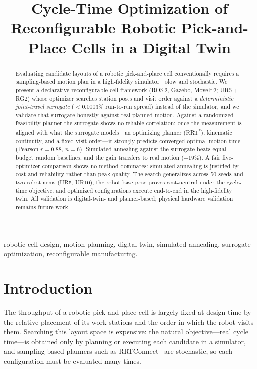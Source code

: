 \documentclass[conference]{IEEEtran}
\begin{document}
\title{Cycle-Time Optimization of Reconfigurable Robotic Pick-and-Place Cells in a Digital Twin}

\author{
}

\maketitle

\begin{abstract}
Evaluating candidate layouts of a robotic pick-and-place cell conventionally requires a
sampling-based motion plan in a high-fidelity simulator---slow and stochastic. We present a
declarative reconfigurable-cell framework (ROS\,2, Gazebo, MoveIt\,2; UR5\,+\,RG2) whose
optimizer searches station poses and visit order against a \emph{deterministic joint-travel
surrogate} ($<\!0.0003\%$ run-to-run spread) instead of the simulator, and we validate that
surrogate honestly against real planned motion. Against a randomized feasibility planner the
surrogate shows no reliable correlation; once the measurement is aligned with what the
surrogate models---an optimizing planner (RRT\textsuperscript{*}), kinematic continuity, and a
fixed visit order---it strongly predicts converged-optimal motion time (Pearson $r=0.88$,
$n=6$). Simulated annealing against the surrogate beats equal-budget random baselines, and the
gain transfers to real motion ($-19\%$). A fair five-optimizer comparison shows no method
dominates: simulated annealing is justified by cost and reliability rather than peak quality.
The search generalizes across 50 seeds and two robot arms (UR5, UR10), the robot base pose
proves cost-neutral under the cycle-time objective, and optimized configurations execute
end-to-end in the high-fidelity twin. All validation is digital-twin- and planner-based;
physical hardware validation remains future work.
\end{abstract}

\begin{IEEEkeywords}
robotic cell design, motion planning, digital twin, simulated annealing, surrogate
optimization, reconfigurable manufacturing.
\end{IEEEkeywords}

\section{Introduction}
The throughput of a robotic pick-and-place cell is largely fixed at design time by the relative
placement of its work stations and the order in which the robot visits them. Searching this
layout space is expensive: the natural objective---real cycle time---is obtained only by
planning or executing each candidate in a simulator, and sampling-based planners such as
RRTConnect~\cite{rrtconnect} are stochastic, so each configuration must be evaluated many times.
\end{document}
